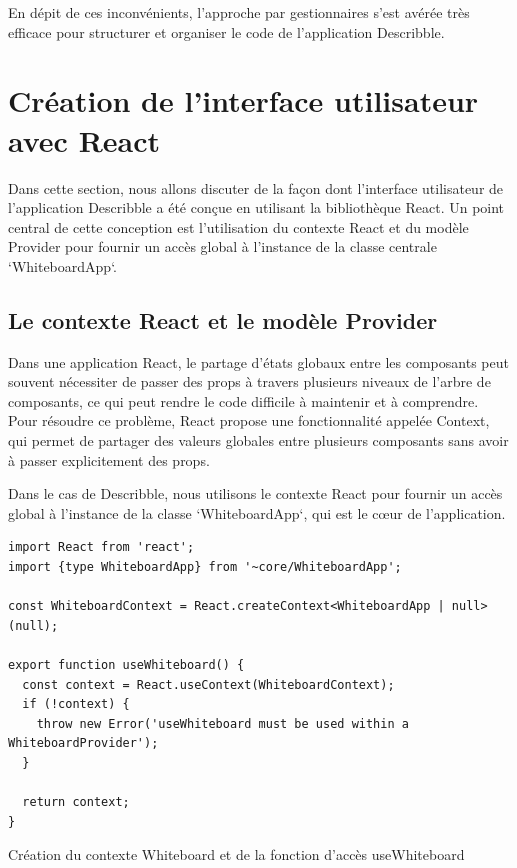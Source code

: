 En dépit de ces inconvénients, l'approche par gestionnaires s'est avérée très efficace pour structurer et organiser le code de l'application Describble.

\section{Création de l'interface utilisateur avec React}

Dans cette section, nous allons discuter de la façon dont l'interface utilisateur de l'application Describble a été conçue en utilisant la bibliothèque React. Un point central de cette conception est l'utilisation du contexte React et du modèle Provider pour fournir un accès global à l'instance de la classe centrale `WhiteboardApp`.

\subsection{Le contexte React et le modèle Provider}

Dans une application React, le partage d'états globaux entre les composants peut souvent nécessiter de passer des props à travers plusieurs niveaux de l'arbre de composants, ce qui peut rendre le code difficile à maintenir et à comprendre. Pour résoudre ce problème, React propose une fonctionnalité appelée Context, qui permet de partager des valeurs globales entre plusieurs composants sans avoir à passer explicitement des props.

Dans le cas de Describble, nous utilisons le contexte React pour fournir un accès global à l'instance de la classe `WhiteboardApp`, qui est le cœur de l'application.

\begin{listing}[H]
    \begin{verbatim}
import React from 'react';
import {type WhiteboardApp} from '~core/WhiteboardApp';

const WhiteboardContext = React.createContext<WhiteboardApp | null>(null);

export function useWhiteboard() {
  const context = React.useContext(WhiteboardContext);
  if (!context) {
    throw new Error('useWhiteboard must be used within a WhiteboardProvider');
  }

  return context;
}
  \end{verbatim}
    \caption{Création du contexte Whiteboard et de la fonction d'accès useWhiteboard}
\end{listing}

